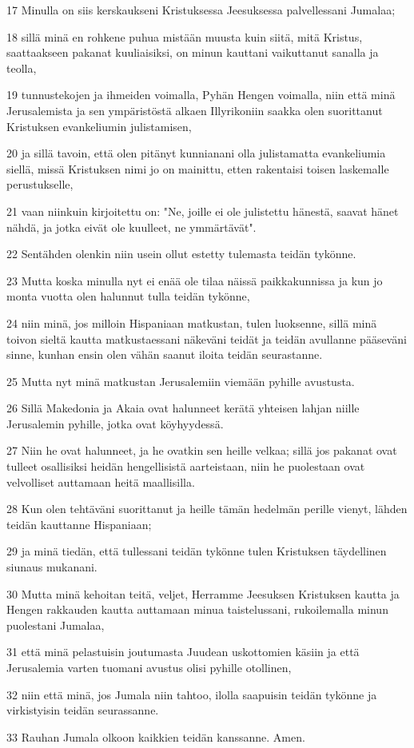 \par 17 Minulla on siis kerskaukseni Kristuksessa Jeesuksessa palvellessani Jumalaa;
\par 18 sillä minä en rohkene puhua mistään muusta kuin siitä, mitä Kristus, saattaakseen pakanat kuuliaisiksi, on minun kauttani vaikuttanut sanalla ja teolla,
\par 19 tunnustekojen ja ihmeiden voimalla, Pyhän Hengen voimalla, niin että minä Jerusalemista ja sen ympäristöstä alkaen Illyrikoniin saakka olen suorittanut Kristuksen evankeliumin julistamisen,
\par 20 ja sillä tavoin, että olen pitänyt kunnianani olla julistamatta evankeliumia siellä, missä Kristuksen nimi jo on mainittu, etten rakentaisi toisen laskemalle perustukselle,
\par 21 vaan niinkuin kirjoitettu on: "Ne, joille ei ole julistettu hänestä, saavat hänet nähdä, ja jotka eivät ole kuulleet, ne ymmärtävät".
\par 22 Sentähden olenkin niin usein ollut estetty tulemasta teidän tykönne.
\par 23 Mutta koska minulla nyt ei enää ole tilaa näissä paikkakunnissa ja kun jo monta vuotta olen halunnut tulla teidän tykönne,
\par 24 niin minä, jos milloin Hispaniaan matkustan, tulen luoksenne, sillä minä toivon sieltä kautta matkustaessani näkeväni teidät ja teidän avullanne pääseväni sinne, kunhan ensin olen vähän saanut iloita teidän seurastanne.
\par 25 Mutta nyt minä matkustan Jerusalemiin viemään pyhille avustusta.
\par 26 Sillä Makedonia ja Akaia ovat halunneet kerätä yhteisen lahjan niille Jerusalemin pyhille, jotka ovat köyhyydessä.
\par 27 Niin he ovat halunneet, ja he ovatkin sen heille velkaa; sillä jos pakanat ovat tulleet osallisiksi heidän hengellisistä aarteistaan, niin he puolestaan ovat velvolliset auttamaan heitä maallisilla.
\par 28 Kun olen tehtäväni suorittanut ja heille tämän hedelmän perille vienyt, lähden teidän kauttanne Hispaniaan;
\par 29 ja minä tiedän, että tullessani teidän tykönne tulen Kristuksen täydellinen siunaus mukanani.
\par 30 Mutta minä kehoitan teitä, veljet, Herramme Jeesuksen Kristuksen kautta ja Hengen rakkauden kautta auttamaan minua taistelussani, rukoilemalla minun puolestani Jumalaa,
\par 31 että minä pelastuisin joutumasta Juudean uskottomien käsiin ja että Jerusalemia varten tuomani avustus olisi pyhille otollinen,
\par 32 niin että minä, jos Jumala niin tahtoo, ilolla saapuisin teidän tykönne ja virkistyisin teidän seurassanne.
\par 33 Rauhan Jumala olkoon kaikkien teidän kanssanne. Amen.

